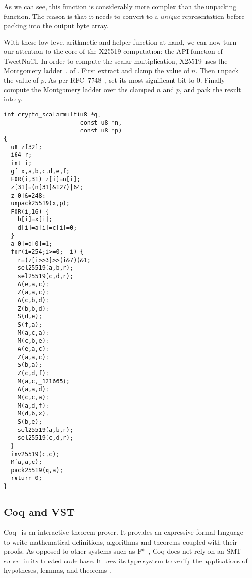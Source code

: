 As we can see, this function is considerably more complex than the
unpacking function. The reason is that it needs to convert
to a \emph{unique} representation before packing into the output
byte array.

With these low-level arithmetic and helper function at hand, we can now
turn our attention to the core of the X25519 computation:
the  API function of TweetNaCl.
In order to compute the scalar multiplication,
X25519 uses the Montgomery ladder~\cite{Mon85}.
of .
First extract and clamp the value of $n$. Then unpack the value of $p$.
As per RFC~7748~\cite{rfc7748}, set its most significant bit to 0.
Finally compute the Montgomery ladder over the clamped $n$ and $p$,
and pack the result into $q$.
\begin{lstlisting}[language=Ctweetnacl]
int crypto_scalarmult(u8 *q,
                      const u8 *n,
                      const u8 *p)
{
  u8 z[32];
  i64 r;
  int i;
  gf x,a,b,c,d,e,f;
  FOR(i,31) z[i]=n[i];
  z[31]=(n[31]&127)|64;
  z[0]&=248;
  unpack25519(x,p);
  FOR(i,16) {
    b[i]=x[i];
    d[i]=a[i]=c[i]=0;
  }
  a[0]=d[0]=1;
  for(i=254;i>=0;--i) {
    r=(z[i>>3]>>(i&7))&1;
    sel25519(a,b,r);
    sel25519(c,d,r);
    A(e,a,c);
    Z(a,a,c);
    A(c,b,d);
    Z(b,b,d);
    S(d,e);
    S(f,a);
    M(a,c,a);
    M(c,b,e);
    A(e,a,c);
    Z(a,a,c);
    S(b,a);
    Z(c,d,f);
    M(a,c,_121665);
    A(a,a,d);
    M(c,c,a);
    M(a,d,f);
    M(d,b,x);
    S(b,e);
    sel25519(a,b,r);
    sel25519(c,d,r);
  }
  inv25519(c,c);
  M(a,a,c);
  pack25519(q,a);
  return 0;
}
\end{lstlisting}

\subsection{Coq and VST}
\label{preliminaries:C}

Coq~\cite{coq-faq} is an interactive theorem prover. It provides an expressive
formal language to write mathematical definitions, algorithms and theorems coupled
with their proofs. As opposed to other systems such as F*~\cite{DBLP:journals/corr/BhargavanDFHPRR17},
Coq does not rely on an SMT solver in its trusted code base.
It uses its type system to verify the applications of hypotheses,
lemmas, and theorems~\cite{Howard1995-HOWTFN}.

